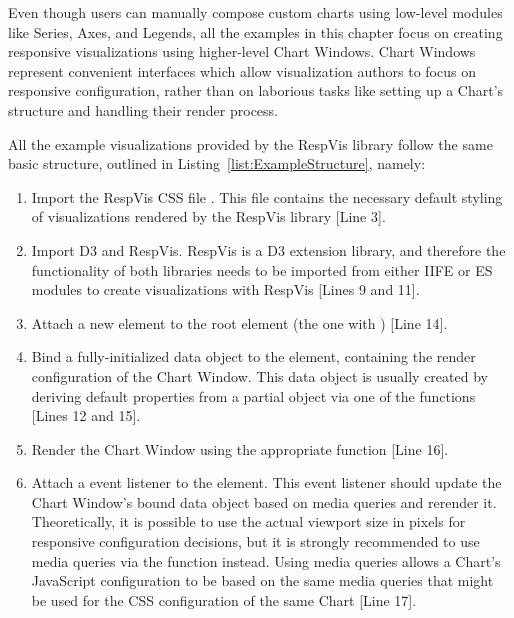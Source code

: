 Even though users can manually compose custom charts using low-level
modules like Series, Axes, and Legends, all the examples in this
chapter focus on creating responsive visualizations using higher-level
Chart Windows. Chart Windows represent convenient interfaces which
allow visualization authors to focus on responsive configuration,
rather than on laborious tasks like setting up a Chart's structure and
handling their render process.

All the example visualizations provided by the RespVis library follow
the same basic structure, outlined in
Listing~\ref{list:ExampleStructure}, namely:
\begin{enumerate}
\item Import the RespVis CSS file . This file
  contains the necessary default styling of visualizations rendered by
  the RespVis library [Line 3].

\item Import D3 and RespVis. RespVis is a D3 extension library, and
  therefore the functionality of both libraries needs to be imported
  from either IIFE or ES modules to create visualizations with
  RespVis [Lines 9 and 11].

\item Attach a new  element to the root 
  element (the one with ) [Line 14].

\item Bind a fully-initialized data object to the  element,
  containing the render configuration of the Chart Window. This data
  object is usually created by deriving default properties from a
  partial object via one of the  functions [Lines 12 and 15].

\item Render the Chart Window using the appropriate
   function [Line 16].

\item Attach a  event listener to the 
  element. This event listener should update the Chart Window's bound
  data object based on media queries and rerender it. Theoretically,
  it is possible to use the actual viewport size in pixels for
  responsive configuration decisions, but it is strongly recommended
  to use media queries via the  function
  instead. Using media queries allows a Chart's JavaScript
  configuration to be based on the same media queries that might be
  used for the CSS configuration of the same Chart [Line 17].
\end{enumerate}



